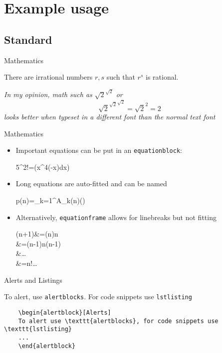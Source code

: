 \documentclass{beamer}
\begin{document}
\section{Example usage}
\subsection{Standard}

\begin{frame}{Mathematics}
\begin{theorem}
	There are irrational numbers $r,s$ such that $r^s$ is rational.
\end{theorem}
\textit{In my opinion, math such as $\sqrt{2}^{\sqrt{2}}$ or 
 $$
 {\sqrt{2}^{\sqrt{2}}}^{\sqrt{2}}=\sqrt{2}^{2}=2
 $$ looks better when typeset in a different font than the normal text font}\hfill\qedsymbol
\end{frame}
\begin{frame}{Mathematics}
\begin{itemize}
	\item Important equations can be put in an \texttt{equationblock}:
	\begin{equationblock}
		5^2!=\exp\left(\int x^4\exp(-x)\;dx\right)
	\end{equationblock}	
	\item Long equations are auto-fitted and can be named
	\begin{equationblock}
		p(n)=\sum_{k=1}^{\infty}A_{k}(n)\left(\sinh{}\right)
	\end{equationblock}
	\item Alternatively, \texttt{equationframe} allows for linebreaks but not fitting
	\begin{equationframe}
		\Gamma(n+1)&=\Gamma(n)n\\
		  &=\Gamma(n-1)n(n-1)\\
		  &\dots\\
		  &=n!\dots
	\end{equationframe}
\end{itemize}
\end{frame}

\begin{frame}[fragile]{Alerts and Listings}
\begin{alertblock}
	To alert, use \texttt{alertblocks}. For code snippets use \texttt{lstlisting}
	\begin{lstlisting}
	\begin{alertblock}[Alerts]
	To alert use \texttt{alertblocks}, for code snippets use \texttt{lstlisting}
	...
	\end{alertblock}
	\end{lstlisting}
\end{alertblock}
\end{frame}
\end{document}
